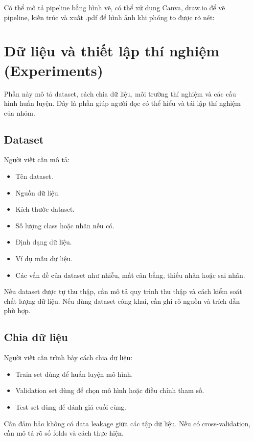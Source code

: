 \documentclass[12pt]{ai_conquer2026}
\begin{document}
Có thể mô tả pipeline bằng hình vẽ, có thể xử dụng Canva, draw.io để vẽ pipeline, kiến trúc và xuất .pdf để hình ảnh khi phóng to được rõ nét:



\section{Dữ liệu và thiết lập thí nghiệm (Experiments)}

Phần này mô tả dataset, cách chia dữ liệu, môi trường thí nghiệm và các cấu hình huấn luyện. Đây là phần giúp người đọc có thể hiểu và tái lập thí nghiệm của nhóm.

\subsection{Dataset}

Người viết cần mô tả:

\begin{itemize}
\item Tên dataset.
\item Nguồn dữ liệu.
\item Kích thước dataset.
\item Số lượng class hoặc nhãn nếu có.
\item Định dạng dữ liệu.
\item Ví dụ mẫu dữ liệu.
\item Các vấn đề của dataset như nhiễu, mất cân bằng, thiếu nhãn hoặc sai nhãn.
\end{itemize}

Nếu dataset được tự thu thập, cần mô tả quy trình thu thập và cách kiểm soát chất lượng dữ liệu. Nếu dùng dataset công khai, cần ghi rõ nguồn và trích dẫn phù hợp.

\subsection{Chia dữ liệu}

Người viết cần trình bày cách chia dữ liệu:

\begin{itemize}
\item Train set dùng để huấn luyện mô hình.
\item Validation set dùng để chọn mô hình hoặc điều chỉnh tham số.
\item Test set dùng để đánh giá cuối cùng.
\end{itemize}

Cần đảm bảo không có data leakage giữa các tập dữ liệu. Nếu có cross-validation, cần mô tả rõ số folds và cách thực hiện.
\end{document}
